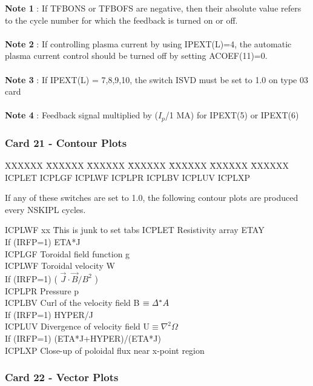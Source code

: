 {\bf Note 1} : If TFBONS or TFBOFS are negative, then their absolute value refers to the cycle
number for which the feedback is turned on or off.\\
 \\
{\bf Note 2} : If controlling plasma current by using IPEXT(L)=4, the automatic plasma current
control should be turned off by setting ACOEF(11)=0.\\
 \\
{\bf Note 3} : If IPEXT(L) = 7,8,9,10, the switch ISVD must be set to 1.0 on type 03 card\\
 \\
{\bf Note 4} : Feedback signal multiplied by ($I_p$/1 MA) for IPEXT(5) or IPEXT(6) 
\pagebreak
\subsubsection{Card 21 - Contour Plots}
\begin{tabbing}
XXXXXX \= XXXXXX \= XXXXXX \= XXXXXX \= XXXXXX \= XXXXXX \=
XXXXXX       \\
\footnotesize  ICPLET  \>\footnotesize ICPLGF  \>\footnotesize ICPLWF \>\footnotesize ICPLPR
\>\footnotesize ICPLBV 
\>\footnotesize ICPLUV \>\footnotesize ICPLXP
\end{tabbing}
If any of these switches are set to 1.0, the following contour plots are produced every NSKIPL
cycles.
\begin{tabbing}
ICPLWF xx \= This is junk to set tabs \kill
ICPLET    \> Resistivity array ETAY\\
        \> If (IRFP=1) ETA*J\\
ICPLGF \> Toroidal field function g\\
ICPLWF \> Toroidal velocity W \\
       \> If (IRFP=1) ( $\vec{J} \cdot \vec{B} /B^2$ ) \\
ICPLPR \> Pressure p\\
ICPLBV \> Curl of the velocity field B $\equiv {\it \Delta}^* A$\\
       \> If (IRFP=1) HYPER/J \\
ICPLUV \> Divergence of velocity field U$\equiv \nabla^2 \Omega$\\
       \> If (IRFP=1) (ETA*J+HYPER)/(ETA*J)\\
ICPLXP \> Close-up of poloidal flux near x-point region
\end{tabbing}
\newpage \subsubsection{Card 22 - Vector Plots}

